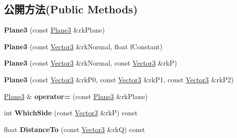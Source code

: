 \subsection*{公開方法(Public Methods)}
\begin{DoxyCompactItemize}
\item 
{\bfseries Plane3} (const \hyperlink{class_magnum_1_1_plane3}{Plane3} \&rk\+Plane)\hypertarget{class_magnum_1_1_plane3_a03918286c6d307ff88c9518ee43b542f}{}\label{class_magnum_1_1_plane3_a03918286c6d307ff88c9518ee43b542f}

\item 
{\bfseries Plane3} (const \hyperlink{class_magnum_1_1_vector3}{Vector3} \&rk\+Normal, float f\+Constant)\hypertarget{class_magnum_1_1_plane3_a1b63df0fe10e6056ddf9c8ecfed36c13}{}\label{class_magnum_1_1_plane3_a1b63df0fe10e6056ddf9c8ecfed36c13}

\item 
{\bfseries Plane3} (const \hyperlink{class_magnum_1_1_vector3}{Vector3} \&rk\+Normal, const \hyperlink{class_magnum_1_1_vector3}{Vector3} \&rkP)\hypertarget{class_magnum_1_1_plane3_a98abcfc1a8c8128b6ad6b9dfa88b5372}{}\label{class_magnum_1_1_plane3_a98abcfc1a8c8128b6ad6b9dfa88b5372}

\item 
{\bfseries Plane3} (const \hyperlink{class_magnum_1_1_vector3}{Vector3} \&rk\+P0, const \hyperlink{class_magnum_1_1_vector3}{Vector3} \&rk\+P1, const \hyperlink{class_magnum_1_1_vector3}{Vector3} \&rk\+P2)\hypertarget{class_magnum_1_1_plane3_a3145e4d209de591eb45a3885b2cd7d28}{}\label{class_magnum_1_1_plane3_a3145e4d209de591eb45a3885b2cd7d28}

\item 
\hyperlink{class_magnum_1_1_plane3}{Plane3} \& {\bfseries operator=} (const \hyperlink{class_magnum_1_1_plane3}{Plane3} \&rk\+Plane)\hypertarget{class_magnum_1_1_plane3_a760f4e92768fc61864b373260d37a3fb}{}\label{class_magnum_1_1_plane3_a760f4e92768fc61864b373260d37a3fb}

\item 
int {\bfseries Which\+Side} (const \hyperlink{class_magnum_1_1_vector3}{Vector3} \&rkP) const \hypertarget{class_magnum_1_1_plane3_a0f54a143f4ecc727ed8ff6b78bcc9465}{}\label{class_magnum_1_1_plane3_a0f54a143f4ecc727ed8ff6b78bcc9465}

\item 
float {\bfseries Distance\+To} (const \hyperlink{class_magnum_1_1_vector3}{Vector3} \&rkQ) const \hypertarget{class_magnum_1_1_plane3_a2753a72a6cac6ba5b12000879d7e0d09}{}\label{class_magnum_1_1_plane3_a2753a72a6cac6ba5b12000879d7e0d09}


\end{DoxyCompactItemize}
